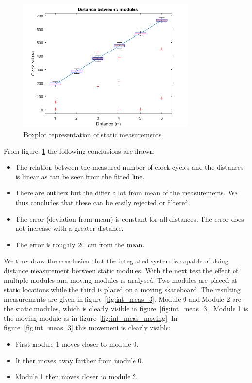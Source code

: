 \begin{figure}[H]
\centering
\includegraphics[width=0.8\textwidth]{Figures/Meas_1.png}
\caption{Boxplot representation of static measurements}
\label{fig:int_meas_2}
\end{figure}

From figure~\ref{fig:int_meas_2} the following conclusions are drawn:

\begin{itemize}
\item The relation between the measured number of clock cycles and the distances is linear as can be seen from the fitted line.
\item There are outliers but the differ a lot from mean of the measurements. We thus concludes that these can be easily rejected or filtered.
\item The error (deviation from mean) is constant for all distances. The error does not increase with a greater distance.
\item The error is roughly \SI{20}{\centi\meter} from the mean.
\end{itemize}

We thus draw the conclusion that the integrated system is capable of doing distance measurement between static modules.
With the next test the effect of multiple modules and moving modules is analysed.
Two modules are placed at static locations while the third is placed on a moving skateboard.
The resulting measurements are given in figure~\ref{fig:int_meas_3}.
Module 0 and Module 2 are the static modules, which is clearly visible in figure~\ref{fig:int_meas_3}.
Module 1 is the moving module as in figure~\ref{fig:int_meas_moving}.
In figure~\ref{fig:int_meas_3} this movement is clearly visible:

\begin{itemize}
\item First module 1 moves closer to module 0.
\item It then moves away farther from module 0.
\item Module 1 then moves closer to module 2.
\end{itemize}

